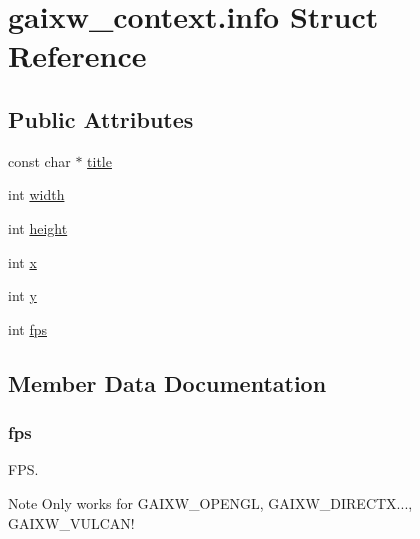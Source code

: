 \hypertarget{structgaixw__context_8info}{}\section{gaixw\+\_\+context.\+info Struct Reference}
\label{structgaixw__context_8info}
\subsection*{Public Attributes}
\begin{DoxyCompactItemize}
\item 
const char $\ast$ \hyperlink{structgaixw__context_8info_ad5d3db1765287eef77d7927cc956f50a}{title}
\item 
int \hyperlink{structgaixw__context_8info_aeaae26a6fb20ed3ef54fb23bfa0b1fcc}{width}
\item 
int \hyperlink{structgaixw__context_8info_ab435e227d5dd201e1768b2bcb2e0aa81}{height}
\item 
int \hyperlink{structgaixw__context_8info_a9dd4e461268c8034f5c8564e155c67a6}{x}
\item 
int \hyperlink{structgaixw__context_8info_a415290769594460e2e485922904f345d}{y}
\item 
int \hyperlink{structgaixw__context_8info_a05934928102b17827b8f03ed60c3e6e0}{fps}
\end{DoxyCompactItemize}


\subsection{Member Data Documentation}
\mbox{\label{structgaixw__context_8info_a05934928102b17827b8f03ed60c3e6e0}} 
\subsubsection{\texorpdfstring{fps}{fps}}
{\footnotesize\ttfamily }

F\+PS. \begin{DoxyNote}{Note}
Only works for G\+A\+I\+X\+W\+\_\+\+O\+P\+E\+N\+GL, G\+A\+I\+X\+W\+\_\+\+D\+I\+R\+E\+C\+TX..., G\+A\+I\+X\+W\+\_\+\+V\+U\+L\+C\+A\+N! 
\end{DoxyNote}
\mbox{\label{structgaixw__context_8info_ab435e227d5dd201e1768b2bcb2e0aa81}} 

